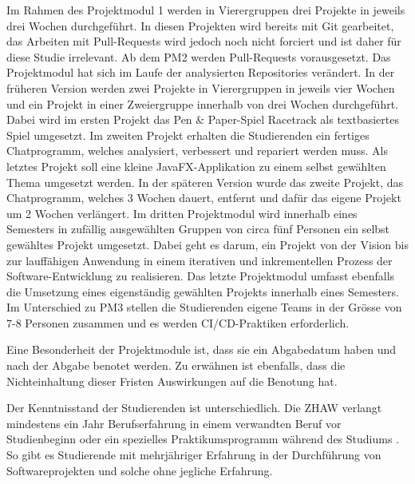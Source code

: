 Im Rahmen des Projektmodul 1 werden in Vierergruppen drei Projekte in jeweils drei Wochen durchgeführt. In diesen Projekten wird bereits mit Git gearbeitet, das Arbeiten mit Pull-Requests wird jedoch noch nicht forciert und ist daher für diese Studie irrelevant. Ab dem PM2 werden Pull-Requests vorausgesetzt. Das Projektmodul hat sich im Laufe der analysierten Repositories verändert. In der früheren Version werden zwei Projekte in Vierergruppen in jeweils vier Wochen und ein Projekt in einer Zweiergruppe innerhalb von drei Wochen durchgeführt. Dabei wird im ersten Projekt das Pen \& Paper-Spiel Racetrack als textbasiertes Spiel umgesetzt. Im zweiten Projekt erhalten die Studierenden ein fertiges Chatprogramm, welches analysiert, verbessert und repariert werden muss. Als letztes Projekt soll eine kleine JavaFX-Applikation zu einem selbst gewählten Thema umgesetzt werden. In der späteren Version wurde das zweite Projekt, das Chatprogramm, welches 3 Wochen dauert, entfernt und dafür das eigene Projekt um 2 Wochen verlängert. Im dritten Projektmodul wird innerhalb eines Semesters in zufällig ausgewählten Gruppen von circa fünf Personen ein selbst gewähltes Projekt umgesetzt. Dabei geht es darum, ein Projekt von der Vision bis zur lauffähigen Anwendung in einem iterativen und inkrementellen Prozess der Software-Entwicklung zu realisieren. Das letzte Projektmodul umfasst ebenfalls die Umsetzung eines eigenständig gewählten Projekts innerhalb eines Semesters. Im Unterschied zu PM3 stellen die Studierenden eigene Teams in der Grösse von 7-8 Personen zusammen und es werden CI/CD-Praktiken erforderlich.

Eine Besonderheit der Projektmodule ist, dass sie ein Abgabedatum haben und nach der Abgabe benotet werden. Zu erwähnen ist ebenfalls, dass die Nichteinhaltung dieser Fristen Auswirkungen auf die Benotung hat.

Der Kenntnisstand der Studierenden ist unterschiedlich. Die ZHAW verlangt mindestens ein Jahr Berufserfahrung in einem verwandten Beruf vor Studienbeginn oder ein spezielles Praktikumsprogramm während des Studiums \parencite{noauthor_aufnahmebedingungen_nodate}. So gibt es Studierende mit mehrjähriger Erfahrung in der Durchführung von Softwareprojekten und solche ohne jegliche Erfahrung. 

